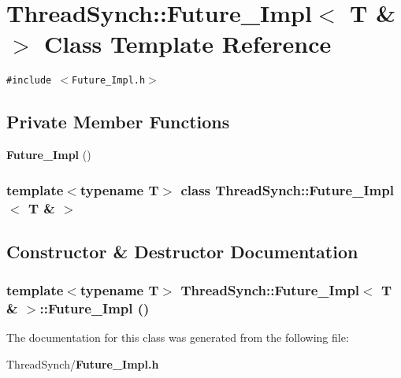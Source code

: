 \section{Thread\-Synch::Future\_\-Impl$<$ T \& $>$ Class Template Reference}
\label{class_thread_synch_1_1_future___impl_3_01_t_01_6_01_4}
{\tt \#include $<$Future\_\-Impl.h$>$}

\subsection*{Private Member Functions}
\begin{CompactItemize}
\item 
{\bf Future\_\-Impl} ()
\end{CompactItemize}
\subsubsection*{template$<$typename T$>$ class Thread\-Synch::Future\_\-Impl$<$ T \& $>$}



\subsection{Constructor \& Destructor Documentation}
\subsubsection{\setlength{\rightskip}{0pt plus 5cm}template$<$typename T$>$ {\bf Thread\-Synch::Future\_\-Impl}$<$ T \& $>$::{\bf Future\_\-Impl} ()\hspace{0.3cm}{\tt  [private]}}\label{class_thread_synch_1_1_future___impl_3_01_t_01_6_01_4_1957f33aea0bf1024bcc176424735f02}




The documentation for this class was generated from the following file:\begin{CompactItemize}
\item 
Thread\-Synch/{\bf Future\_\-Impl.h}\end{CompactItemize}
